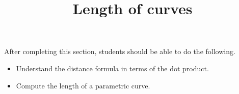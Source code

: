 \documentclass{ximera}
\title{Length of curves}
\begin{document}
\begin{abstract}
\end{abstract}

\maketitle

\begin{sectionOutcomes}

After completing this section, students should be able to do the following.

\begin{itemize}
\item Understand the distance formula in terms of the dot product.
\item Compute the length of a parametric curve.
\end{itemize}

\end{sectionOutcomes}
\end{document}

